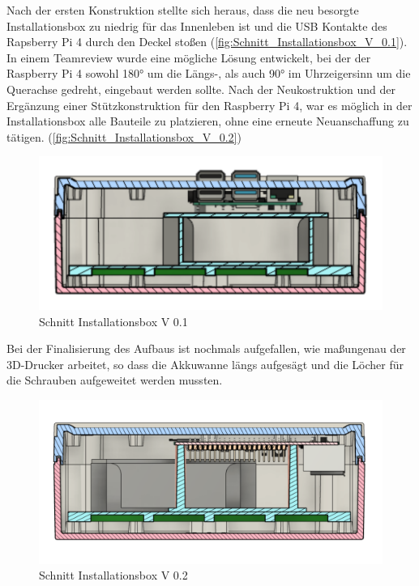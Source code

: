 Nach der ersten Konstruktion stellte sich heraus, dass die neu besorgte Installationsbox zu niedrig für das Innenleben ist und die USB Kontakte des Rapsberry Pi 4 durch den Deckel stoßen (\autoref{fig:Schnitt_Installationsbox_V_0.1}). In einem Teamreview wurde eine mögliche Lösung entwickelt, bei der der Raspberry Pi 4 sowohl \ang{180} um die Längs-, als auch \ang{90} im Uhrzeigersinn um die Querachse gedreht, eingebaut werden sollte. Nach der Neukostruktion und der Ergänzung einer Stützkonstruktion für den Raspberry Pi 4, war es möglich in der Installationsbox alle Bauteile zu platzieren, ohne eine erneute Neuanschaffung zu tätigen. (\autoref{fig:Schnitt_Installationsbox_V_0.2})

\begin{figure}[h]
	\begin{center}
		\includegraphics[scale=0.25]{Sections/Konstruktion_des_Aufbaus/Schnitt_Installationsbox_V_0.1}
	\end{center}
	\caption{Schnitt Installationsbox V 0.1}
	\label{fig:Schnitt_Installationsbox_V_0.1}
\end{figure}

Bei der Finalisierung des Aufbaus ist nochmals aufgefallen, wie maßungenau der 3D-Drucker arbeitet, so dass die Akkuwanne längs aufgesägt und die Löcher für die Schrauben aufgeweitet werden mussten.

\begin{figure}[h]
	\begin{center}
		\includegraphics[scale=0.28]{Sections/Konstruktion_des_Aufbaus/Schnitt_Installationsbox_V_0.2}
	\end{center}
	\caption{Schnitt Installationsbox V 0.2}
	\label{fig:Schnitt_Installationsbox_V_0.2}
\end{figure}

